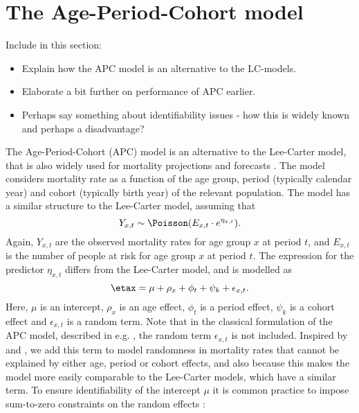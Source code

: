 \newpage
\section{The Age-Period-Cohort model}
\label{sec:APC-model}
\textcolor{myDarkGreen}{
Include in this section:
\begin{itemize}
    \item Explain how the APC model is an alternative to the LC-models.
    \item Elaborate a bit further on performance of APC earlier. 
    \item Perhaps say something about identifiability issues - how this is widely known and perhaps a disadvantage?
\end{itemize}
}
The Age-Period-Cohort (APC) model is an alternative to the Lee-Carter model, that is also widely used for mortality projections and forecasts \parencite{rieblerHeld2010}. The model considers mortality rate as a function of the age group, period (typically calendar year) and cohort (typically birth year) of the relevant population. The model has a similar structure to the Lee-Carter model, assuming that 
\begin{equation}
    Y_{x,t} \sim \Poisson(E_{x,t}\cdot e^{\eta_{x,t}}).
    \label{eq:APClikelihood}
\end{equation}
Again, $Y_{x,t}$ are the observed mortality rates for age group $x$ at period $t$, and $E_{x,t}$ is the number of people at risk for age group $x$ at period $t$. The expression for the predictor $\eta_{x,t}$ differs from the Lee-Carter model, and is modelled as
\begin{equation}
    \etax = \mu + \rho_x + \phi_t + \psi_k + \epsilon_{x,t}.
    \label{eq:APCmodel}
\end{equation}
Here, $\mu$ is an intercept, $\rho_x$ is an age effect, $\phi_t$ is a period effect, $\psi_k$ is a cohort effect and $\epsilon_{x,t}$ is a random term. Note that in the classical formulation of the APC model, described in e.g. \textcite{Clayton1987}, the random term $\epsilon_{x,t}$ is not included. Inspired by \textcite{RieblerThesis2010} and \textcite{Besag1995}, we add this term to model randomness in mortality rates that cannot be explained by either age, period or cohort effects, and also because this makes the model more easily comparable to the Lee-Carter models, which have a similar term. 
\newline
\noindent To ensure identifiability of the intercept $\mu$ it is common practice to impose sum-to-zero constraints on the random effects \parencite{RieblerThesis2010}:
